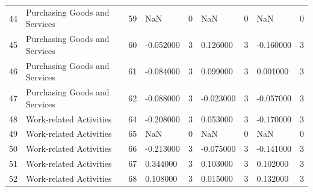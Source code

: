 \begin{tabular}{lllllllll}
44 & Purchasing Goods and Services & 59 & NaN & 0 & NaN & 0 & NaN & 0 \\
45 & Purchasing Goods and Services & 60 & -0.052000 & 3 & 0.126000 & 3 & -0.160000 & 3 \\
46 & Purchasing Goods and Services & 61 & -0.084000 & 3 & 0.099000 & 3 & 0.001000 & 3 \\
47 & Purchasing Goods and Services & 62 & -0.088000 & 3 & -0.023000 & 3 & -0.057000 & 3 \\
48 & Work-related Activities & 64 & -0.208000 & 3 & 0.053000 & 3 & -0.170000 & 3 \\
49 & Work-related Activities & 65 & NaN & 0 & NaN & 0 & NaN & 0 \\
50 & Work-related Activities & 66 & -0.213000 & 3 & -0.075000 & 3 & -0.141000 & 3 \\
51 & Work-related Activities & 67 & 0.344000 & 3 & 0.103000 & 3 & 0.102000 & 3 \\
52 & Work-related Activities & 68 & 0.108000 & 3 & 0.015000 & 3 & 0.132000 & 3 \\
\bottomrule
\end{tabular}

